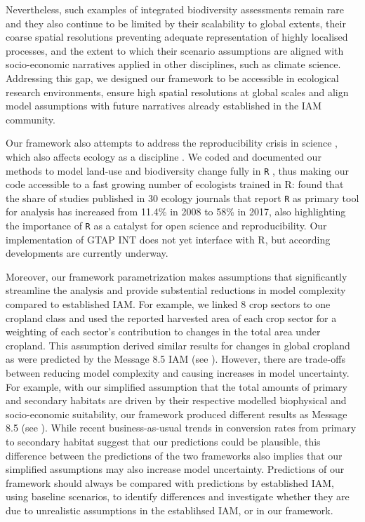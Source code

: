 Nevertheless, such examples of integrated biodiversity assessments remain rare and they also continue to be limited by their scalability to global extents, their coarse spatial resolutions preventing adequate representation of highly localised processes, and the extent to which their scenario assumptions are aligned with socio-economic narratives applied in other disciplines, such as climate science. Addressing this gap, we designed our framework to be accessible in ecological research environments, ensure high spatial resolutions at global scales and align model assumptions with future narratives already established in the IAM community.

Our framework also attempts to address the reproducibility crisis in science \citep{open_science_collaboration_estimating_2015}, which also affects ecology as a discipline \citep{fidler_metaresearch_2017, fernandez-juricic_why_2021}. We coded and documented our methods to model land-use and biodiversity change fully in \texttt{R} \citep{r_development_core_team_r_2008}, thus making our code accessible to a fast growing number of ecologists trained in R: \citet{lai_evaluating_2019} found that the share of studies published in 30 ecology journals that report \texttt{R} as primary tool for analysis has increased from 11.4\% in 2008 to 58\% in 2017, also highlighting the importance of \texttt{R} as a catalyst for open science and reproducibility. Our implementation of GTAP INT does not yet interface with R, but according developments are currently underway.

Moreover, our framework parametrization makes assumptions that significantly streamline the analysis and provide substential reductions in model complexity compared to established IAM. For example, we linked 8 crop sectors to one cropland class and used the reported harvested area of each crop sector for a weighting of each sector's contribution to changes in the total area under cropland. This assumption derived similar results for changes in global cropland as were predicted by the Message 8.5 IAM (see ). However, there are trade-offs between reducing model complexity and causing increases in model uncertainty. For example, with our simplified assumption that the total amounts of primary and secondary habitats are driven by their respective modelled biophysical and socio-economic suitability, our framework produced different results as Message 8.5 (see ). While recent business-as-usual trends in conversion rates from primary to secondary habitat suggest that our predictions could be plausible, this difference between the predictions of the two frameworks also implies that our simplified assumptions may also increase model uncertainty. Predictions of our framework should always be compared with predictions by established IAM, using baseline scenarios, to identify differences and investigate whether they are due to unrealistic assumptions in the establihsed IAM, or in our framework.

